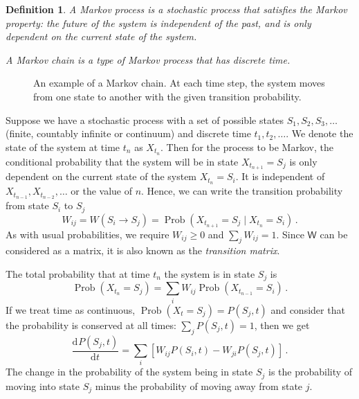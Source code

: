 \documentclass{article}
\theoremstyle{plain}\theoremheaderfont{\normalfont\itshape}\theorembodyfont{\rmfamily}\theoremseparator{.}\newtheorem*{rem}{Remark}\newtheorem*{ex}{Example}\newtheorem*{proof}{Proof}\newtheorem*{altp}{Alternative proof}
\theoremstyle{plain}\theoremheaderfont{\normalfont\bfseries}\theorembodyfont{\rmfamily}\theoremseparator{.}\newtheorem{thm}{Theorem}[section]\newtheorem{lem}[thm]{Lemma}\newtheorem{prop}[thm]{Proposition}\newtheorem*{cor}{Corollary}\newtheorem{defn}[thm]{Definition}\newtheorem{clm}[thm]{Claim}\newtheorem{clminproof}{Claim}\newtheorem{alg}[thm]{Algorithm}\newtheorem{hyp}[thm]{Hypothesis}\newtheorem{law}[thm]{Law}
\theoremstyle{break}\theoremheaderfont{\normalfont\itshape}\theorembodyfont{\rmfamily}\theoremseparator{.\medskip}\newtheorem*{proofskip}{Proof}\newtheorem*{exs}{Examples}\newtheorem*{rems}{Remarks}
\theoremstyle{break}\theoremheaderfont{\normalfont\bfseries}\theorembodyfont{\rmfamily}\theoremseparator{.\medskip}\newtheorem{lemskip}[thm]{Lemma}\newtheorem{defnskip}[thm]{Definition}\newtheorem{propskip}[thm]{Proposition}\newtheorem{thmskip}[thm]{Theorem}
\numberwithin{equation}{section}
\newcommand{\dv}[3][]{\frac{\mathrm{d}^{#1} #2}{{\mathrm{d} #3}^{#1}}}
\DeclareMathOperator{\Prob}{Prob}
\begin{document}
    \begin{defn}
        A \textit{Markov process} is a stochastic process that satisfies the \textit{Markov property}: the future of the system is independent of the past, and is only dependent on the current state of the system.

        A \textit{Markov chain} is a type of Markov process that has discrete time.
    \end{defn}

    \begin{figure}
        \centering
        \caption{An example of a Markov chain. At each time step, the system moves from one state to another with the given transition probability.}
    \end{figure}

    Suppose we have a stochastic process with a set of possible states \(S_1,S_2,S_3,\dots\) (finite, countably infinite or continuum) and discrete time \(t_1,t_2,\dots\). We denote the state of the system at time \(t_n\) as \(X_{t_n}\). Then for the process to be Markov, the conditional probability that the system will be in state \(X_{t_{n+1}}=S_j\) is only dependent on the current state of the system \(X_{t_n}=S_i\). It is independent of \(X_{t_{n-1}},X_{t_{n-2}},\dots\) or the value of \(n\). Hence, we can write the transition probability from state \(S_i\) to \(S_j\)
    \begin{equation}
        W_{ij}=W(S_i\to S_j)=\Prob(X_{t_{n+1}}=S_j\mid X_{t_n}=S_i)\,.
    \end{equation}
    As with usual probabilities, we require \(W_{ij}\ge 0\) and \(\sum_j W_{ij}=1\). Since \(\mathsf{W}\) can be considered as a matrix, it is also known as the \textit{transition matrix}.

    The total probability that at time \(t_n\) the system is in state \(S_j\) is
    \begin{equation}
        \Prob(X_{t_n}=S_j)=\sum_i W_{ij}\Prob(X_{t_{n-1}}=S_i)\,.
    \end{equation}
    If we treat time as continuous, \(\Prob(X_{t}=S_j)=P(S_j,t)\) and consider that the probability is conserved at all times: \(\sum_j P(S_j,t)=1\), then we get
    \begin{equation}
        \dv{P(S_j,t)}{t}=\sum_i[W_{ij}P(S_i,t)-W_{ji}P(S_j,t)]\,.
    \end{equation}
    The change in the probability of the system being in state \(S_j\) is the probability of moving into state \(S_j\) minus the probability of moving away from state \(j\).
\end{document}
